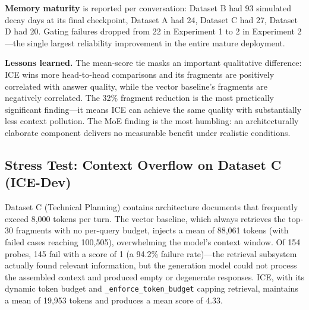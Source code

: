 \documentclass[11pt,a4paper]{article}
\begin{document}
\textbf{Memory maturity} is reported per conversation: Dataset B had 93 simulated decay days at its final checkpoint, Dataset A had 24, Dataset C had 27, Dataset D had 20. Gating failures dropped from 22 in Experiment 1 to 2 in Experiment 2---the single largest reliability improvement in the entire mature deployment.

\textbf{Lessons learned.} The mean-score tie masks an important qualitative difference: ICE wins more head-to-head comparisons and its fragments are positively correlated with answer quality, while the vector baseline's fragments are negatively correlated. The 32\% fragment reduction is the most practically significant finding---it means ICE can achieve the same quality with substantially less context pollution. The MoE finding is the most humbling: an architecturally elaborate component delivers no measurable benefit under realistic conditions.

\subsection{Stress Test: Context Overflow on Dataset C (ICE-Dev)}
\label{sec:stress}

Dataset C (Technical Planning) contains architecture documents that frequently exceed 8{,}000 tokens per turn. The vector baseline, which always retrieves the top-30 fragments with no per-query budget, injects a mean of 88{,}061 tokens (with failed cases reaching 100{,}505), overwhelming the model's context window. Of 154 probes, 145 fail with a score of 1 (a 94.2\% failure rate)---the retrieval subsystem actually found relevant information, but the generation model could not process the assembled context and produced empty or degenerate responses. ICE, with its dynamic token budget and \texttt{\_enforce\_token\_budget} capping retrieval, maintains a mean of 19{,}953 tokens and produces a mean score of 4.33.
\end{document}
